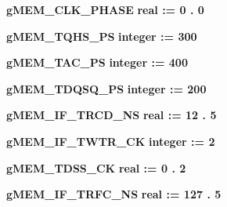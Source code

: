 \begin{DoxyCompactItemize}
\item 
{\bf g\+M\+E\+M\+\_\+\+C\+L\+K\+\_\+\+P\+H\+A\+SE} {\bfseries {\bfseries \textcolor{comment}{real}\textcolor{vhdlchar}{ }\textcolor{vhdlchar}{ }\textcolor{vhdlchar}{\+:}\textcolor{vhdlchar}{=}\textcolor{vhdlchar}{ }\textcolor{vhdlchar}{ } \textcolor{vhdldigit}{0} \textcolor{vhdlchar}{.} \textcolor{vhdldigit}{0} \textcolor{vhdlchar}{ }}} 
\item 
{\bf g\+M\+E\+M\+\_\+\+T\+Q\+H\+S\+\_\+\+PS} {\bfseries {\bfseries \textcolor{comment}{integer}\textcolor{vhdlchar}{ }\textcolor{vhdlchar}{ }\textcolor{vhdlchar}{\+:}\textcolor{vhdlchar}{=}\textcolor{vhdlchar}{ }\textcolor{vhdlchar}{ } \textcolor{vhdldigit}{300} \textcolor{vhdlchar}{ }}} 
\item 
{\bf g\+M\+E\+M\+\_\+\+T\+A\+C\+\_\+\+PS} {\bfseries {\bfseries \textcolor{comment}{integer}\textcolor{vhdlchar}{ }\textcolor{vhdlchar}{ }\textcolor{vhdlchar}{\+:}\textcolor{vhdlchar}{=}\textcolor{vhdlchar}{ }\textcolor{vhdlchar}{ } \textcolor{vhdldigit}{400} \textcolor{vhdlchar}{ }}} 
\item 
{\bf g\+M\+E\+M\+\_\+\+T\+D\+Q\+S\+Q\+\_\+\+PS} {\bfseries {\bfseries \textcolor{comment}{integer}\textcolor{vhdlchar}{ }\textcolor{vhdlchar}{ }\textcolor{vhdlchar}{\+:}\textcolor{vhdlchar}{=}\textcolor{vhdlchar}{ }\textcolor{vhdlchar}{ } \textcolor{vhdldigit}{200} \textcolor{vhdlchar}{ }}} 
\item 
{\bf g\+M\+E\+M\+\_\+\+I\+F\+\_\+\+T\+R\+C\+D\+\_\+\+NS} {\bfseries {\bfseries \textcolor{comment}{real}\textcolor{vhdlchar}{ }\textcolor{vhdlchar}{ }\textcolor{vhdlchar}{\+:}\textcolor{vhdlchar}{=}\textcolor{vhdlchar}{ }\textcolor{vhdlchar}{ } \textcolor{vhdldigit}{12} \textcolor{vhdlchar}{.} \textcolor{vhdldigit}{5} \textcolor{vhdlchar}{ }}} 
\item 
{\bf g\+M\+E\+M\+\_\+\+I\+F\+\_\+\+T\+W\+T\+R\+\_\+\+CK} {\bfseries {\bfseries \textcolor{comment}{integer}\textcolor{vhdlchar}{ }\textcolor{vhdlchar}{ }\textcolor{vhdlchar}{\+:}\textcolor{vhdlchar}{=}\textcolor{vhdlchar}{ }\textcolor{vhdlchar}{ } \textcolor{vhdldigit}{2} \textcolor{vhdlchar}{ }}} 
\item 
{\bf g\+M\+E\+M\+\_\+\+T\+D\+S\+S\+\_\+\+CK} {\bfseries {\bfseries \textcolor{comment}{real}\textcolor{vhdlchar}{ }\textcolor{vhdlchar}{ }\textcolor{vhdlchar}{\+:}\textcolor{vhdlchar}{=}\textcolor{vhdlchar}{ }\textcolor{vhdlchar}{ } \textcolor{vhdldigit}{0} \textcolor{vhdlchar}{.} \textcolor{vhdldigit}{2} \textcolor{vhdlchar}{ }}} 
\item 
{\bf g\+M\+E\+M\+\_\+\+I\+F\+\_\+\+T\+R\+F\+C\+\_\+\+NS} {\bfseries {\bfseries \textcolor{comment}{real}\textcolor{vhdlchar}{ }\textcolor{vhdlchar}{ }\textcolor{vhdlchar}{\+:}\textcolor{vhdlchar}{=}\textcolor{vhdlchar}{ }\textcolor{vhdlchar}{ } \textcolor{vhdldigit}{127} \textcolor{vhdlchar}{.} \textcolor{vhdldigit}{5} \textcolor{vhdlchar}{ }}} 

\end{DoxyCompactItemize}

